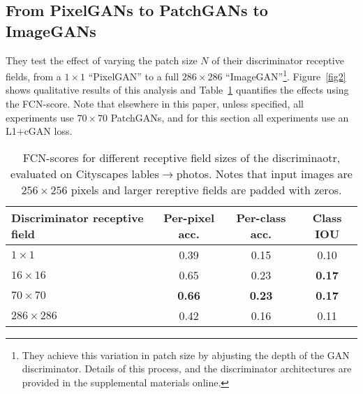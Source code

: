 \documentclass[10pt,twocolumn,letterpaper]{article}
\begin{document}
\subsection{From PixelGANs to PatchGANs to ImageGANs}

They test the effect of varying the patch size $N$ of their discriminator receptive fields, from a $1 \times 1$ ``PixelGAN'' to a full $286 \times 286$ ``ImageGAN''\footnote{They achieve this variation in patch size by abjusting the depth of the GAN discriminator. Details of this process, and the discriminator architectures are provided in the supplemental materials online.}. Figure~\ref{fig2} shows qualitative results of this analysis and Table~\ref{tab2} quantifies the effects using the FCN-score. Note that elsewhere in this paper, unless specified, all experiments use $70\times 70$ PatchGANs, and for this section all experiments use an L1+cGAN loss.


\begin{table}
\scriptsize
\begin{center}
\begin{tabular}{p{2cm}ccc}
  {\bf Discriminator receptive field} & {\bf Per-pixel acc.} & {\bf Per-class acc.} & {\bf Class IOU} \\
  \hline
  {\bf $1\times 1$} & 0.39 & 0.15 & 0.10 \\
  {\bf $16\times 16$} & 0.65 & 0.23 & {\bf 0.17} \\
  {\bf $70\times 70$} & {\bf 0.66} & {\bf 0.23} & {\bf 0.17} \\
  {\bf $286\times 286$} & 0.42 & 0.16 & 0.11
\end{tabular}
\end{center}
\caption{FCN-scores for different receptive field sizes of the discriminaotr, evaluated on Cityscapes lables$\rightarrow$photos. Notes that input images are $256\times 256$ pixels and larger rereptive fields are padded with zeros.}
\label{tab2}
\end{table}



{\small


}
\end{document}
